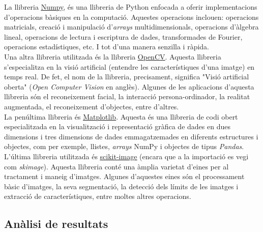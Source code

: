 \documentclass[a4paper,12pt]{article}
\begin{document}
La llibreria \href{https://numpy.org}{\underline{Numpy}}, és una llibreria de Python enfocada a oferir implementacions d'operacions bàsiques en la computació. Aquestes operacions inclouen: operacions matricials, creació i manipulació d'\textit{arrays} multidimensionals, operacions d'àlgebra lineal, operacions de lectura i escriptura de dades, transformades de Fourier, operacions estadístiques, etc. I tot d'una manera senzilla i ràpida.\\
Una altra llibreria utilitzada és la llibreria \href{https://docs.opencv.org/4.x/d6/d00/tutorial_py_root.html}{\underline{OpenCV}}. Aquesta llibreria s'especialitza en la visió artificial (entendre les característiques d'una imatge) en temps real. De fet, el nom de la llibreria, precisament, significa "Visió artificial oberta" (\textit{Open Computer Vision} en anglès). Algunes de les aplicacions d'aquesta llibreria són el reconeixement facial, la interacció persona-ordinador, la realitat augmentada, el reconeixement d'objectes, entre d'altres.\\
La penúltima llibreria és \href{https://matplotlib.org}{\underline{Matplotlib}}. Aquesta és una llibreria de codi obert especialitzada en la visualització i representació gràfica de dades en dues dimensions i tres dimensions de dades emmagatzemades en diferents estructures i objectes, com per exemple, llistes, \textit{arrays} NumPy i objectes de tipus \textit{Pandas}.\\
L'última llibreria utilitzada és \href{https://scikit-image.org}{\underline{scikit-image}} (encara que a la importació es vegi com \textit{skimage}). Aquesta llibreria conté una àmplia varietat d'eines per al tractament i maneig d'imatges. Algunes d'aquestes eines són el processament bàsic d'imatges, la seva segmentació, la detecció dels límits de les imatges i extracció de característiques, entre moltes altres operacions. 
\subsection*{Anàlisi de resultats}
\end{document}
